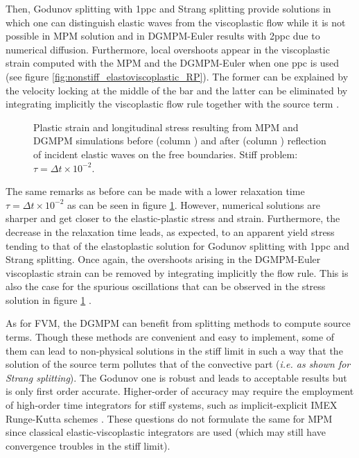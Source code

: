 Then, Godunov splitting with 1ppc and Strang splitting provide solutions in which one can distinguish elastic waves from the viscoplastic flow while it is not possible in MPM solution and in DGMPM-Euler results with 2ppc due to numerical diffusion.
Furthermore, local overshoots appear in the viscoplastic strain computed with the MPM and the DGMPM-Euler when one ppc is used (see figure \ref{fig:nonstiff_elastoviscoplastic_RP}). 
The former can be explained by the velocity locking at the middle of the bar and the latter can be eliminated by integrating implicitly the viscoplastic flow rule together with the source term \cite{Thomas_EVP}.
\begin{figure}[h!]
  \centering
  { \label{subfig:evp_stiff1}}
  { \label{subfig:evp_stiff3}}
  {}
  \caption{Plastic strain and longitudinal stress resulting from MPM and DGMPM simulations before (column ) and after (column ) reflection of incident elastic waves on the free boundaries. Stiff problem: $\tau=\Delta t \times 10^{-2}$.}
  \label{fig:siff_elastoviscoplastic_RP}
\end{figure}

The same remarks as before can be made with a lower relaxation time $\tau=\Delta t \times 10^{-2}$ as can be seen in figure \ref{fig:siff_elastoviscoplastic_RP}. However, numerical solutions are sharper and get closer to the elastic-plastic stress and strain.
Furthermore, the decrease in the relaxation time leads, as expected, to an apparent yield stress tending to that of the elastoplastic solution for Godunov splitting with 1ppc and Strang splitting.
Once again, the overshoots arising in the DGMPM-Euler viscoplastic strain can be removed by integrating implicitly the flow rule. This is also the case for the spurious oscillations that can be observed in the stress solution in figure \ref{fig:siff_elastoviscoplastic_RP} \cite{Thomas_EVP}. 


As for FVM, the DGMPM can benefit from splitting methods to compute source terms.
Though these methods are convenient and easy to implement, some of them can lead to non-physical solutions in the stiff limit in such a way that the solution of the source term pollutes that of the convective part (\textit{i.e. as shown for Strang splitting}).
The Godunov one is robust and leads to acceptable results but is only first order accurate.
Higher-order of accuracy may require the employment of high-order time integrators for stiff systems, such as implicit-explicit IMEX Runge-Kutta schemes \cite{Pareschi_stiff}.
These questions do not formulate the same for MPM since classical elastic-viscoplastic integrators are used (which may still have convergence troubles in the stiff limit).


